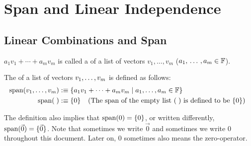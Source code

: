 \section{Span and Linear Independence}
\subsection{Linear Combinations and Span}

\setcounter{thm}{1}
\begin{mydef} 
  $a_1 v_1 + \cdots + a_m v_m$ is called a  of a list of vectors $v_1, \dots, v_m$ ($a_1, {\, \ldots \,\,}, a_m \in \mathbb{F}$).
\end{mydef}

\setcounter{thm}{3}
\begin{mydef} 
	The  of a list of vectors $v_1, \dots, v_m$ is defined as follows:
  \begin{equation}
    \begin{aligned}
      \operatorname{span} (v_1, \dots, v_m) &:\equiv \{a_1 v_1 + \cdots + a_m v_m \mid a_1, \dots, a_m \in \mathbb{F} \}\\
      \operatorname{span} (\; ) &:\equiv \{ 0 \} \;\;\, \text{ (The span of the empty list $(\;)$ is defined to be $\{0\}$)}\;\;
    \end{aligned}
  \end{equation}

  The definition also implies that $\operatorname{span} ( 0) = \{0\}$, or written differently, $\operatorname{span} (\vec 0) = \{\vec 0\}$. Note that sometimes we write $\vec 0$ and sometimes we write $0$ throughout this document. Later on, $0$ sometimes also means the zero-operator.
\end{mydef}

